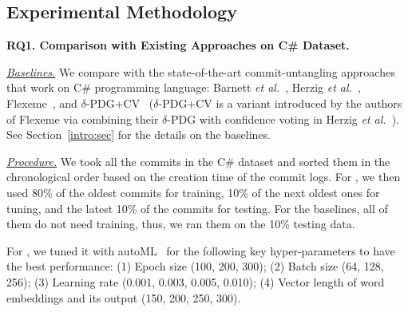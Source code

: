 

\subsection{Experimental Methodology}
\label{method:sec}

\noindent\textbf{RQ1. Comparison with Existing Approaches on C\# Dataset.}

{\em \underline{Baselines.}} We compare {\tool} with the
state-of-the-art commit-untangling approaches that work on C\#
programming language: Barnett {\em et al.}~\cite{barnett-icse15},
Herzig {\em et al.}~\cite{kim-emse16}, Flexeme~\cite{flexeme-fse20},
and $\delta$-PDG+CV~\cite{flexeme-fse20} ($\delta$-PDG+CV is a variant
introduced by the authors of Flexeme via combining their $\delta$-PDG
with confidence voting in Herzig {\em et al.}~\cite{kim-emse16}). See
Section~\ref{intro:sec} for the details on the baselines.


\textit{\underline{Procedure.}}
We took all the commits in the C\# dataset and sorted them in the
chronological order based on the creation time of the commit logs. For
{\tool}, we then used 80\% of the oldest commits for training, 10\% of
the next oldest ones for tuning, and the latest 10\% of the commits
for testing. For the baselines, all of them do not need training,
thus, we ran them on the 10\% testing data.

For {\tool}, we tuned it with autoML~\cite{NNI} for the following
key hyper-parameters to have the best performance: (1) Epoch size
(100, 200, 300); (2) Batch size (64, 128, 256); (3) Learning rate
(0.001, 0.003, 0.005, 0.010); (4) Vector length of word embeddings and
its output (150, 200, 250, 300).

